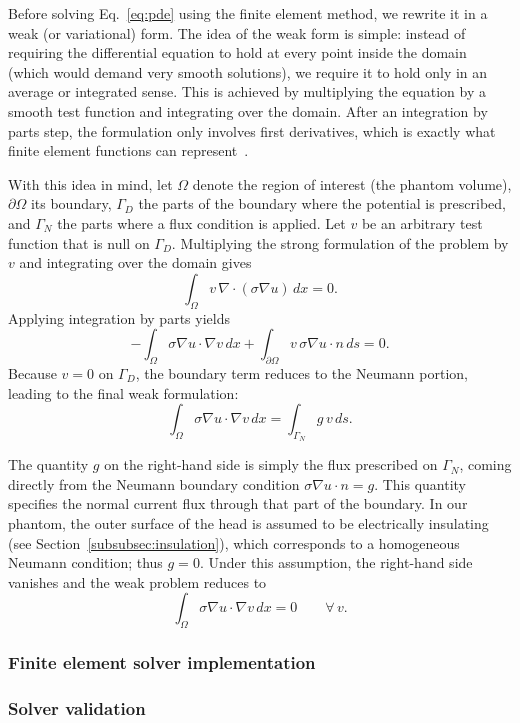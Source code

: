 Before solving Eq.~\eqref{eq:pde} using the finite element method, we rewrite it
in a weak (or variational) form. The idea of the weak form is simple: instead
of requiring the differential equation to hold at every point inside the domain
(which would demand very smooth solutions), we require it to hold only in an
average or integrated sense. This is achieved by multiplying the equation by a
smooth test function and integrating over the domain. After an integration by
parts step, the formulation only involves first derivatives, which is exactly
what finite element functions can represent~\cite{fem-org}.

With this idea in mind, let $\Omega$ denote the region of interest (the phantom
volume), $\partial\Omega$ its boundary, $\Gamma_D$ the parts of the boundary
where the potential is prescribed, and $\Gamma_N$ the parts where a flux
condition is applied. Let $v$ be an arbitrary test function that is null on
$\Gamma_D$. Multiplying the strong formulation of the problem by $v$ and
integrating over the domain gives
\[
\int_\Omega v\, \nabla\cdot(\sigma\nabla u)\, dx = 0.
\]
Applying integration by parts yields
\[
- \int_\Omega \sigma \nabla u \cdot \nabla v\, dx
+ \int_{\partial\Omega} v\, \sigma \nabla u \cdot n\, ds = 0.
\]
Because $v = 0$ on $\Gamma_D$, the boundary term reduces to the Neumann portion,
leading to the final weak formulation:
\[
\int_\Omega \sigma \nabla u \cdot \nabla v\, dx
= \int_{\Gamma_N} g\, v\, ds.
\]

The quantity $g$ on the right-hand side is simply the flux prescribed on
$\Gamma_N$, coming directly from the Neumann boundary condition
$\sigma\nabla u \cdot n = g$. This quantity specifies the normal current flux
through that part of the boundary. In our phantom, the outer
surface of the head is assumed to be electrically insulating
(see Section~\ref{subsubsec:insulation}), which corresponds to a homogeneous
Neumann condition; thus $g = 0$. Under this assumption, the right-hand side
vanishes and the weak problem reduces to
\[
\int_\Omega \sigma \nabla u \cdot \nabla v\, dx = 0
\qquad \forall\, v.
\]



\subsubsection{Finite element solver implementation}



\subsubsection{Solver validation}
